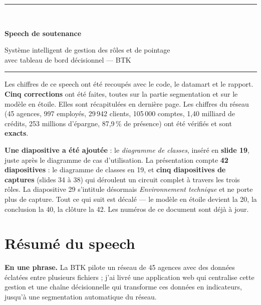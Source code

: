 \documentclass[a4paper,11pt]{article}
\begin{document}
\begin{center}
{\color{btkblue}\rule{\textwidth}{2pt}}\\[0.3cm]
{\huge\bfseries\color{btkblue} Speech de soutenance\par}
\vspace{0.2cm}
{\large Système intelligent de gestion des rôles et de pointage\\
avec tableau de bord décisionnel --- BTK\par}
\vspace{0.2cm}
{\color{btkblue}\rule{\textwidth}{2pt}}
\end{center}

\vspace{0.4cm}
\begin{corrige}[title={Version vérifiée --- ce qui a changé}]
Les chiffres de ce speech ont été recoupés avec le code, le datamart et le
rapport. \textbf{Cinq corrections} ont été faites, toutes sur la partie
segmentation et sur le modèle en étoile. Elles sont récapitulées en dernière
page. Les chiffres du réseau (45 agences, 997 employés, 29\,942 clients,
105\,000 comptes, 1,40 milliard de crédits, 253 millions d'épargne,
87,9\,\% de présence) ont été vérifiés et sont \textbf{exacts}.

\medskip
\textbf{Une diapositive a été ajoutée} : le \emph{diagramme de classes},
inséré en \textbf{slide 19}, juste après le diagramme de cas d'utilisation. La
présentation compte \textbf{42 diapositives} : le diagramme de classes en 19,
et \textbf{cinq diapositives de captures} (slides 34 à 38) qui déroulent un
circuit complet à travers les trois rôles. La diapositive 29 s'intitule
désormais \emph{Environnement technique} et ne porte plus de capture. Tout ce
qui suit est décalé --- le modèle en étoile devient la 20, la conclusion la 40,
la clôture la 42. Les numéros de ce document sont déjà à jour.
\end{corrige}

\section*{Résumé du speech}

\noindent\textbf{En une phrase.} La BTK pilote un réseau de 45 agences avec des
données éclatées entre plusieurs fichiers ; j'ai livré une application web qui
centralise cette gestion et une chaîne décisionnelle qui transforme ces données
en indicateurs, jusqu'à une segmentation automatique du réseau.
\end{document}
